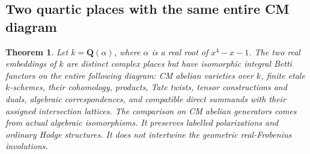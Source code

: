 \documentclass[11pt]{article}
\newtheorem{theorem}{Theorem}[section]
\theoremstyle{definition}\newtheorem{definition}[theorem]{Definition}
\theoremstyle{remark}\newtheorem{remark}[theorem]{Remark}
\newcommand{\Q}{\mathbf Q}\newcommand{\Z}{\mathbf Z}
\begin{document}
\subsection{Two quartic places with the same entire CM diagram}
\begin{theorem}\label{thm:quartic-CM-comparison}
Let $k=\Q(\alpha)$, where $\alpha$ is a real root of $x^4-x-1$.
The two real embeddings of $k$ are distinct complex places but have
isomorphic integral Betti functors on the entire following diagram:
CM abelian varieties over $k$, finite etale $k$-schemes, their
cohomology, products, Tate twists, tensor constructions and duals,
algebraic correspondences, and compatible direct summands with their
assigned intersection lattices. The comparison on CM abelian generators
comes from actual algebraic isomorphisms. It preserves labelled
polarizations and ordinary Hodge structures. It does not intertwine
the geometric real-Frobenius involutions.
\end{theorem}
\end{document}
